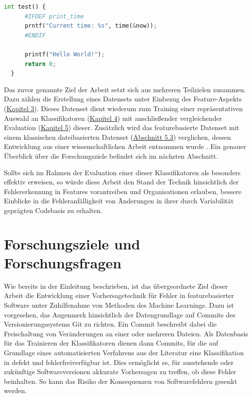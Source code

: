 \begin{lstlisting}[language=Python, caption=Exemplarische Darstellung eines fehlerhaften Features, frame=single, label=bug-code]
int test() {
	  #IFDEF print_time
	  prntf("Current time: %s", time(&now));
	  #ENDIF

	  printf("Hello World!");
	  return 0;
  }
\end{lstlisting}
 
Das zuvor genannte Ziel der Arbeit setzt sich aus mehreren Teilzielen zusammen. Dazu zählen die Erstellung eines Datensets unter Einbezug des Feature-Aspekts (\hyperref[dataset-creation]{Kapitel 3}). Dieses Datenset dient wiederum zum Training einer repräsentativen Auswahl an Klassifikatoren (\hyperref[training]{Kapitel 4}) mit anschließender vergleichender Evaluation (\hyperref[evaluation]{Kapitel 5}) dieser. Zusätzlich wird das featurebasierte Datenset mit einem klassischen dateibasierten Datenset (\hyperref[classic-eval]{Abschnitt 5.3}) verglichen, dessen Entwicklung aus einer wissenschaftlichen Arbeit entnommen wurde \cite{Moser2008}. Ein genauer Überblick über die Forschungsziele befindet sich im nächsten Abschnitt.

Sollte sich im Rahmen der Evaluation einer dieser Klassifikatoren als besonders effektiv erweisen, so würde diese Arbeit den Stand der Technik hinsichtlich der Fehlererkennung in Features vorantreiben und Organisationen erlauben, bessere Einblicke in die Fehleranfälligkeit von Änderungen in ihrer durch Variabilität geprägten Codebasis zu erhalten.

\section{Forschungsziele und Forschungsfragen}

Wie bereits in der Einleitung beschrieben, ist das übergeordnete Ziel dieser Arbeit die Entwicklung einer Vorhersagetechnik für Fehler in featurebasierter Software unter Zuhilfenahme von Methoden des Machine Learnings. Dazu ist vorgesehen, das Augenmerk hinsichtlich der Datengrundlage auf Commits des Versionierungssystems Git zu richten. Ein Commit beschreibt dabei die Freischaltung von Veränderungen an einer oder mehreren Dateien. Als Datenbasis für das Trainieren der Klassifikatoren dienen dann Commits, für die auf Grundlage eines automatisierten Verfahrens aus der Literatur eine Klassifikation in \glqq defekt\grqq{} und \glqq fehlerfrei{}\grqq verfügbar ist. Dies ermöglicht es, für ausstehende oder zukünftige Softwareversionen akkurate Vorhersagen zu treffen, ob diese Fehler beinhalten. So kann das Risiko der Konsequenzen von Softwarefehlern gesenkt werden.

